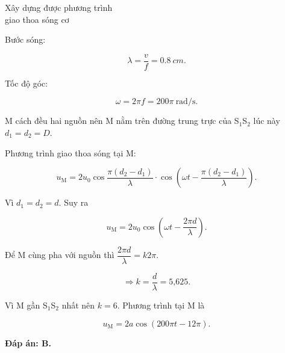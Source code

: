 \begin{dang}{Xây dựng được phương trình\\ giao thoa sóng cơ}
{		Bước sóng:
		
		\begin{equation*}
			\lambda =\dfrac{v}{f} = \SI{0,8}{cm}.
		\end{equation*}
		
		Tốc độ góc:
		
		\begin{equation*}
			\omega = 2\pi f = 200\pi\ \text{rad/s}.
		\end{equation*}
		
		M cách đều hai nguồn nên M nằm trên đường trung trực của S$_1$S$_2$ lúc này $d_1=d_2 = D$.
		
		Phương trình giao thoa sóng tại M: 
		
		\begin{equation*}
			u_\text{M} = 2u_0 \cos \dfrac{\pi(d_2-d_1)}{\lambda} \cdot \cos \left (\omega t -\dfrac{\pi(d_2-d_1)}{\lambda}\right).
		\end{equation*}
		
		Vì $d_1=d_2=d$.	Suy ra
		
		\begin{equation*}
			u_\text{M} = 2u_0 \cos \left(\omega t -\dfrac{2\pi d}{\lambda}\right).
		\end{equation*}
		
		Để M cùng pha với nguồn thì $\dfrac{2\pi d}{\lambda} =k2\pi$. 
		
		\begin{equation*}
			\Rightarrow k =\dfrac{d}{\lambda} = \text{5,625}.
		\end{equation*}
		
		Vì M gần S$_1$S$_2$ nhất nên $k=6$. Phương trình tại M là
		
		\begin{equation*}
			u_\text{M} = 2a\cos (200\pi t - 12\pi).
		\end{equation*}
		
		\textbf{Đáp án: B.}
	}
	
\end{dang}